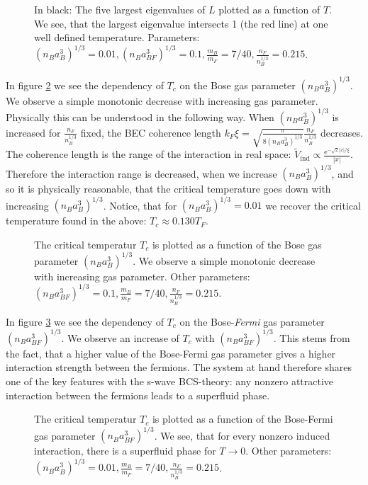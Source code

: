 \begin{figure} 
\begin{center}  
  
\caption{In black: The five largest eigenvalues of $L$ plotted as a function of $T$. We see, that the largest eigenvalue intersects 1 (the red line) at one well defined temperature. Parameters: $(n_Ba_{B}^3)^{1/3} = 0.01, (n_Ba_{BF}^3)^{1/3} = 0.1, \frac{m_B}{m_F} = 7/40, \frac{n_F}{n_B^{1/3}} = 0.215$. }
\label{fig.TCeigenvalues}  
\end{center}    
\end{figure}


In figure \ref{fig.TCrB} we see the dependency of $T_c$ on the Bose gas parameter $(n_Ba_B^3)^{1/3}$. We observe a simple monotonic decrease with increasing gas parameter. Physically this can be understood in the following way. When $(n_Ba_B^3)^{1/3}$ is increased for $\frac{n_F}{n_B^{1/3}}$ fixed, the BEC coherence length $k_F\xi = \sqrt{ \frac{\pi}{ 8(n_Ba_B^3)^{1/3} } }\frac{ n_F }{ n_B^{1/3} }$ decreases. The coherence length is the range of the interaction in real space: $\tilde{V}_{\text{ind}} \propto \frac{ \text{e}^{ -\sqrt{2}|x|/\xi } } {|x|}$. Therefore the interaction range is decreased, when we increase $(n_Ba_B^3)^{1/3}$, and so it is physically reasonable, that the critical temperature goes down with increasing $(n_Ba_B^3)^{1/3}$. Notice, that for $(n_Ba_{B}^3)^{1/3} = 0.01$ we recover the critical temperature found in the above: $T_c \approx 0.130 T_F$. 

\begin{figure} 
\begin{center}  
  
\caption{The critical temperatur $T_c$ is plotted as a function of the Bose gas parameter $(n_Ba_B^3)^{1/3}$. We observe a simple monotonic decrease with increasing gas parameter. Other parameters: $(n_Ba_{BF}^3)^{1/3} = 0.1, \frac{m_B}{m_F} = 7/40, \frac{n_F}{n_B^{1/3}} = 0.215$. }  
\label{fig.TCrB}  
\end{center}    
\end{figure}

In figure \ref{fig.TCrBF} we see the dependency of $T_c$ on the Bose-\textit{Fermi} gas parameter $(n_Ba_{BF}^3)^{1/3}$. We observe an increase of $T_c$ with $(n_Ba_{BF}^3)^{1/3}$. This stems from the fact, that a higher value of the Bose-Fermi gas parameter gives a higher interaction strength between the fermions. The system at hand therefore shares one of the key features with the s-wave BCS-theory: any nonzero attractive interaction between the fermions leads to a superfluid phase. 

\begin{figure} 
\begin{center}  
  
\caption{The critical temperatur $T_c$ is plotted as a function of the Bose-Fermi gas parameter $(n_Ba_{BF}^3)^{1/3}$. We see, that for every nonzero induced interaction, there is a superfluid phase for $T\to 0$. Other parameters: $(n_Ba_{B}^3)^{1/3} = 0.01, \frac{m_B}{m_F} = 7/40, \frac{n_F}{n_B^{1/3}} = 0.215$. }  
\label{fig.TCrBF}  
\end{center}    
\end{figure}




